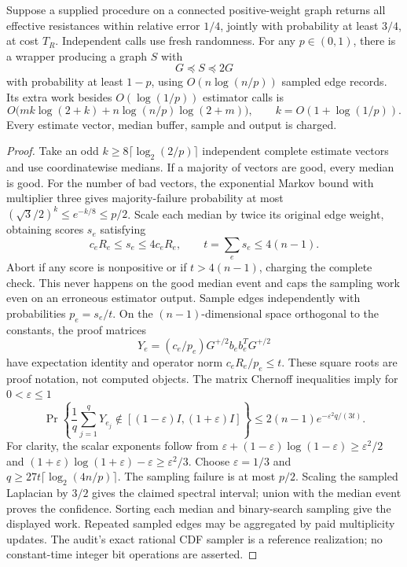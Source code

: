\begin{proposition}
\label{prop:op3-spectral-confidence-wrapper}
Suppose a supplied procedure on a connected positive-weight graph
returns all effective resistances within relative error $1/4$, jointly
with probability at least $3/4$, at cost $T_R$. Independent calls use
fresh randomness. For any $p\in(0,1)$, there is a wrapper producing a
graph $S$ with
\[
 G\preceq S\preceq2G
\]
with probability at least $1-p$, using $O(n\log(n/p))$ sampled edge
records. Its extra work besides $O(\log(1/p))$ estimator calls is
\[
 O\bigl(mk\log(2+k)+n\log(n/p)\log(2+m)\bigr),
 \qquad k=O(1+\log(1/p)).
\]
Every estimate vector, median buffer, sample and output is charged.
\end{proposition}
\begin{proof}
Take an odd $k\geq8\lceil\log_2(2/p)\rceil$ independent complete
estimate vectors and use coordinatewise medians. If a majority of
vectors are good, every median is good. For the number of bad vectors,
the exponential Markov bound with multiplier three gives majority-failure
probability at most $(\sqrt3/2)^k\leq e^{-k/8}\leq p/2$.
Scale each median by twice its original edge weight, obtaining scores
$s_e$ satisfying
\[
c_eR_e\leq s_e\leq4c_eR_e,
 \qquad t=\sum_es_e\leq4(n-1).
\]
Abort if any score is nonpositive or if $t>4(n-1)$, charging the
complete check. This never happens on the good median event and caps
the sampling work even on an erroneous estimator output.
Sample edges independently with probabilities $p_e=s_e/t$. On the
$(n-1)$-dimensional space orthogonal to the constants, the proof matrices
\[
 Y_e=(c_e/p_e)G^{+/2}b_eb_e^TG^{+/2}
\]
have expectation identity and operator norm $c_eR_e/p_e\leq t$.
These square roots are proof notation, not computed objects.
The matrix Chernoff inequalities
\citep[Corollary 5.2]{tropp2012tails} imply for $0<\varepsilon\leq1$
\[
 \Pr\!\left\{\frac1q\sum_{j=1}^qY_{e_j}
       \notin[(1-\varepsilon)I,(1+\varepsilon)I]\right\}
 \leq2(n-1)e^{-\varepsilon^2q/(3t)}.
\]
For clarity, the scalar exponents follow from
$\varepsilon+(1-\varepsilon)\log(1-\varepsilon)\geq\varepsilon^2/2$
and $(1+\varepsilon)\log(1+\varepsilon)-\varepsilon\geq\varepsilon^2/3$.
Choose $\varepsilon=1/3$ and
$q\geq27t\lceil\log_2(4n/p)\rceil$. The sampling failure is at
most $p/2$. Scaling the sampled Laplacian by $3/2$ gives the claimed
spectral interval; union with the median event proves the confidence.
Sorting each median and binary-search sampling give the displayed work.
Repeated sampled edges may be aggregated by paid multiplicity updates.
The audit's exact rational CDF sampler is a reference realization; no
constant-time integer bit operations are asserted.
\end{proof}


